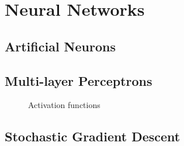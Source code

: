 \section{Neural Networks}
\label{sec:neural_networks}

\subsection{Artificial Neurons}


\subsection{Multi-layer Perceptrons}
\label{sec:general_architecture}
\begin{figure}[ht!]
	\centering
	
\caption{Activation functions}
\label{fig:activation_functions}
\end{figure}

\subsection{Stochastic Gradient Descent}
\label{sec:sgd}

